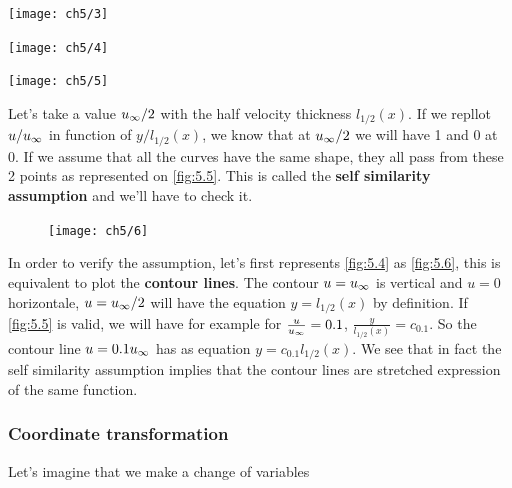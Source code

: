 		 \begin{center}
		 \begin{minipage}{0.28\textwidth}
	 		\begin{center}
	 		\texttt{[image: ch5/3]}
	 		\end{center}
	 		\label{fig:5.3}
	 \end{minipage}
	 	 \begin{minipage}{0.4\textwidth}
			 \begin{center}
			 \texttt{[image: ch5/4]} 
			 \end{center}
	 		\label{fig:5.4}
	 \end{minipage}
	 	 \begin{minipage}{0.3\textwidth}
	 	 	\begin{center}
	 	 	\texttt{[image: ch5/5]}
	 	 	\end{center}
	 		\label{fig:5.5}
	 \end{minipage}
		 \end{center}


	 Let's take a value $u_\infty /2$ with the half velocity thickness $l_{1/2}(x)$. If we repllot $u/u_\infty$ in function of $y/l_{1/2}(x)$, we know that at $u_\infty /2$ we will have 1 and 0 at 0. If we assume that all the curves have the same shape, they all pass from these 2 points as represented on \autoref{fig:5.5}. This is called the \textbf{self similarity assumption} and we'll have to check it.  		 \\
		 
	\begin{figure}
	\vspace{-5mm}
	\texttt{[image: ch5/6]}
	\label{fig:5.6}
	\end{figure}
	In order to verify the assumption, let's first represents \autoref{fig:5.4} as \autoref{fig:5.6}, this is equivalent to plot the \textbf{contour lines}. The contour $u=u_\infty$ is vertical and $u=0$ horizontale, $u=u_\infty /2$ will have the equation $y = l_{1/2}(x)$ by definition. If \autoref{fig:5.5} is valid, we will have for example for $\frac{u}{u_\infty} = 0.1$, $\frac{y}{l_{1/2}(x)} = c_{0.1}$. So the contour line $u = 0.1 u_\infty$ has as equation $y = c_{0.1}l_{1/2}(x)$. We see that in fact the self similarity assumption implies that the contour lines are stretched expression of the same function. 
	
	\newpage
	
	\subsubsection{Coordinate transformation}
		Let's imagine that we make a change of variables 

